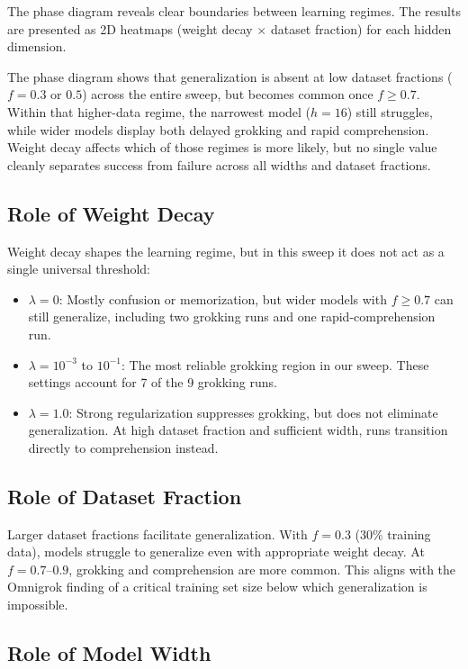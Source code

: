 \documentclass[11pt,a4paper]{article}
\begin{document}
The phase diagram reveals clear boundaries between learning regimes. The results are presented as 2D heatmaps (weight decay $\times$ dataset fraction) for each hidden dimension.

The phase diagram shows that generalization is absent at low dataset fractions ($f = 0.3$ or $0.5$) across the entire sweep, but becomes common once $f \geq 0.7$. Within that higher-data regime, the narrowest model ($h = 16$) still struggles, while wider models display both delayed grokking and rapid comprehension. Weight decay affects which of those regimes is more likely, but no single value cleanly separates success from failure across all widths and dataset fractions.

\subsection{Role of Weight Decay}

Weight decay shapes the learning regime, but in this sweep it does not act as a single universal threshold:
\begin{itemize}
  \item $\lambda = 0$: Mostly confusion or memorization, but wider models with $f \geq 0.7$ can still generalize, including two grokking runs and one rapid-comprehension run.
  \item $\lambda = 10^{-3}$ to $10^{-1}$: The most reliable grokking region in our sweep. These settings account for 7 of the 9 grokking runs.
  \item $\lambda = 1.0$: Strong regularization suppresses grokking, but does not eliminate generalization. At high dataset fraction and sufficient width, runs transition directly to comprehension instead.
\end{itemize}

\subsection{Role of Dataset Fraction}

Larger dataset fractions facilitate generalization. With $f = 0.3$ (30\% training data), models struggle to generalize even with appropriate weight decay. At $f = 0.7$--$0.9$, grokking and comprehension are more common. This aligns with the Omnigrok finding \citep{liu2022omnigrok} of a critical training set size below which generalization is impossible.

\subsection{Role of Model Width}
\end{document}
